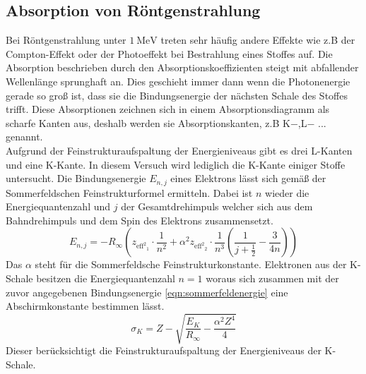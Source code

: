 \subsection{Absorption von Röntgenstrahlung}
Bei Röntgenstrahlung unter $\SI{1}{\mega\electronvolt}$ treten sehr häufig andere Effekte wie z.B der Compton-Effekt oder der Photoeffekt bei Bestrahlung eines Stoffes auf.
Die Absorption beschrieben durch den Absorptionskoeffizienten steigt mit abfallender Wellenlänge sprunghaft an. Dies geschieht immer dann wenn die Photonenergie gerade so groß ist, 
dass sie die Bindungsenergie der nächsten Schale des Stoffes trifft.
Diese Absorptionen zeichnen sich in einem Absorptionsdiagramm als scharfe Kanten aus, deshalb werden sie Absorptionskanten, z.B K${-}$,L${-}$ ... genannt.
\\
Aufgrund der Feinstrukturaufspaltung der Energieniveaus gibt es drei L-Kanten und eine K-Kante. In diesem Versuch wird lediglich die K-Kante einiger Stoffe untersucht.
Die Bindungsenergie $E_{n,j}$ eines Elektrons lässt sich gemäß der Sommerfeldschen Feinstrukturformel ermitteln. Dabei ist $n$ wieder die Energiequantenzahl und $j$ der Gesamtdrehimpuls welcher sich aus dem Bahndrehimpuls und dem
Spin des Elektrons zusammensetzt.
\begin{equation}
\label{eqn:sommerfeldenergie}
E_{n,j} = -R_{\infty} \left(z_{{{\text{eff}}^{2}}_{1}} \cdot \frac{1}{n^{2}} + {\alpha}^{2} z_{{{\text{eff}}^{2}}_{2}} \cdot \frac{1}{n^{3}} \left( \frac{1}{j + \frac{1}{2}} - \frac{3}{4n}\right)  \right)
\end{equation}
Das $\alpha$ steht für die Sommerfeldsche Feinstrukturkonstante. Elektronen aus der K-Schale besitzen die Energiequantenzahl $n = 1$ woraus sich zusammen mit der zuvor angegebenen Bindungsenergie \ref{eqn:sommerfeldenergie} eine
Abschirmkonstante bestimmen lässt.
\begin{equation}
\label{eqn:kackeq}
\sigma_{K} = Z - \sqrt{\frac{E_{K}}{R_{\infty}} - \frac{{\alpha}^{2}Z^{4}}{4}}
\end{equation}
Dieser berücksichtigt die Feinstrukturaufspaltung der Energieniveaus der K-Schale.

